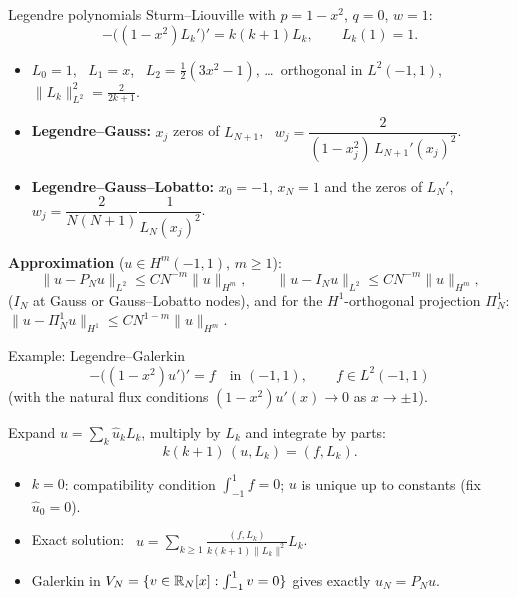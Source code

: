 \begin{frame}{Legendre polynomials}
    \small
    Sturm--Liouville with $p = 1 - x^2$, $q = 0$, $w = 1$:
    \[
        -\big((1-x^2) L_k'\big)' = k(k+1) L_k, \qquad L_k(1) = 1 .
    \]
    \begin{itemize}
        \item $L_0 = 1$, \ $L_1 = x$, \ $L_2 = \frac12(3x^2 - 1)$, \dots \ orthogonal in $L^2(-1,1)$, $\|L_k\|^2_{L^2} = \frac{2}{2k+1}$.
        \item \textbf{Legendre--Gauss:} $x_j$ zeros of $L_{N+1}$, \ $w_j = \dfrac{2}{(1 - x_j^2)\, L_{N+1}'(x_j)^2}$.
        \item \textbf{Legendre--Gauss--Lobatto:} $x_0 = -1$, $x_N = 1$ and the zeros of $L_N'$, \ $w_j = \dfrac{2}{N(N+1)} \dfrac{1}{L_N(x_j)^2}$.
    \end{itemize}
    \textbf{Approximation} ($u \in H^m(-1,1)$, $m \ge 1$):
    \[
        \|u - P_N u\|_{L^2} \le C N^{-m} \|u\|_{H^m},
        \qquad
        \|u - I_N u\|_{L^2} \le C N^{-m}\|u\|_{H^m},
    \]
    ($I_N$ at Gauss or Gauss--Lobatto nodes), and for the $H^1$-orthogonal projection $\Pi^1_N$:
    \(
    \|u - \Pi^1_N u\|_{H^1} \le C N^{1-m}\|u\|_{H^m}.
    \)
\end{frame}

\begin{frame}{Example: Legendre--Galerkin}
    \[
        -\big((1-x^2) u'\big)' = f \quad \text{in } (-1,1), \qquad f \in L^2(-1,1)
    \]
    (with the natural flux conditions $(1-x^2)u'(x) \to 0$ as $x \to \pm1$).
    \medskip

    Expand $u = \sum_k \hat u_k L_k$, multiply by $L_k$ and integrate by parts:
    \[
        k(k+1)\, (u, L_k) = (f, L_k).
    \]
    \begin{itemize}
        \item $k = 0$: compatibility condition $\int_{-1}^1 f = 0$; $u$ is unique up to constants (fix $\hat u_0 = 0$).
        \item Exact solution: \ $u = \sum_{k \ge 1} \frac{(f, L_k)}{k(k+1)\|L_k\|^2} L_k$.
        \item Galerkin in $V_N = \{v \in {\mathbb R}_N[x] : \int_{-1}^1 v = 0\}$ gives exactly $u_N = P_N u$.
    \end{itemize}
\end{frame}

